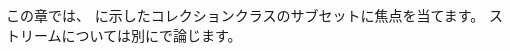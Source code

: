 \documentclass[a4paper,10pt,twoside]{book}
\begin{document}



この章では、 に示したコレクションクラスのサブセットに焦点を当てます。
ストリームについては別にで論じます。


\end{document}
